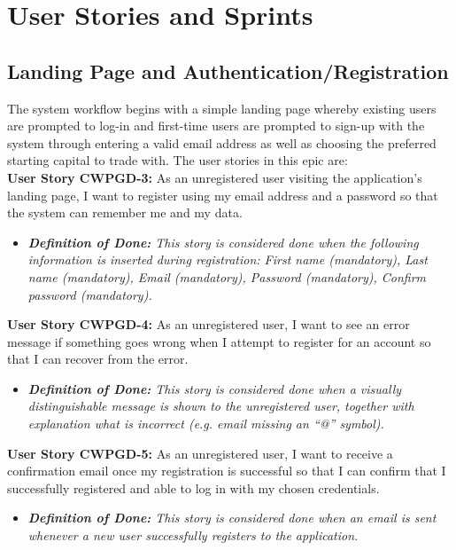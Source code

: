 
\section{User Stories and Sprints}
    \label{sec:user_stories}

\subsection{Landing Page and Authentication/Registration}
    \label{subsec:landing_page}
    
The system workflow begins with a simple landing page whereby existing users are prompted to log-in and first-time users are prompted to sign-up with the system through entering a valid email address as well as choosing the preferred starting capital to trade with. The user stories in this epic are:\\

\noindent \textbf{User Story CWPGD-3:} As an unregistered user visiting the application’s landing page, I want to register using my email address and a password so that the system can remember me and my data.
\begin{itemize}
	\item \textit{\textbf{Definition of Done:} This story is considered done when the following information is inserted during registration: First name (mandatory), Last name (mandatory), Email (mandatory), Password (mandatory), Confirm password (mandatory).}
\end{itemize}

\noindent \textbf{User Story CWPGD-4:} As an unregistered user, I want to see an error message if something goes wrong when I attempt to register for an account so that I can recover from the error.
\begin{itemize}
	\item \textit{\textbf{Definition of Done:} This story is considered done when a visually distinguishable message is shown to the unregistered user, together with explanation what is incorrect (e.g. email missing an “@” symbol).} 
\end{itemize}

\noindent \textbf{User Story CWPGD-5:}  As an unregistered user, I want to receive a confirmation email once my registration is successful so that I can confirm that I successfully registered and able to log in with my chosen credentials.
\begin{itemize}
	\item \textit{\textbf{Definition of Done:} This story is considered done when an email is sent whenever a new user successfully registers to the application.} 
\end{itemize}

